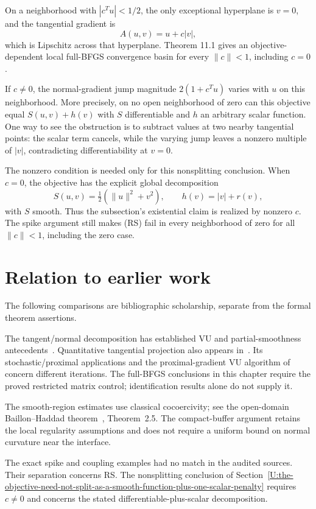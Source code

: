 On a neighborhood with \(|c^Tu|<1/2\), the only exceptional hyperplane
is \(v=0\), and the tangential gradient is \[
 A(u,v)=u+c|v|,
\] which is Lipschitz across that hyperplane. Theorem 11.1 gives an objective-dependent local full-BFGS convergence basin for every $\|c\|<1$, including $c=0$.

If $c\ne0$, the normal-gradient jump magnitude $2(1+c^Tu)$ varies with $u$ on this neighborhood. More precisely, on no open neighborhood of zero can this objective equal $S(u,v)+h(v)$ with $S$ differentiable and $h$ an arbitrary scalar function. One way to see the obstruction is to subtract values at two nearby tangential points: the scalar term cancels, while the varying jump leaves a nonzero multiple of $|v|$, contradicting differentiability at $v=0$.

The nonzero condition is needed only for this nonsplitting conclusion. When $c=0$, the objective has the explicit global decomposition
\[
 S(u,v)=\tfrac12(\|u\|^2+v^2),\qquad h(v)=|v|+r(v),
\]
with $S$ smooth. Thus the subsection's existential claim is realized by nonzero $c$. The spike argument still makes (RS) fail in every neighborhood of zero for all $\|c\|<1$, including the zero case.


\endgroup


\section*{Relation to earlier work}
The following comparisons are bibliographic scholarship, separate from the formal theorem assertions.

The tangent/normal decomposition has established VU and partial-smoothness antecedents~\cite{geom_Lewis2002,LL}. Quantitative tangential projection also appears in~\cite{geom_DDJ2026}. Its stochastic/proximal applications and the proximal-gradient VU algorithm of~\cite{geom_LSS2025} concern different iterations. The full-BFGS conclusions in this chapter require the proved restricted matrix control; identification results alone do not supply it.

The smooth-region estimates use classical cocoercivity; see the open-domain Baillon--Haddad theorem~\cite{WW}, Theorem~2.5. The compact-buffer argument retains the local regularity assumptions and does not require a uniform bound on normal curvature near the interface.

The exact spike and coupling examples had no match in the audited sources. Their separation concerns RS. The nonsplitting conclusion of Section~\ref{U:the-objective-need-not-split-as-a-smooth-function-plus-one-scalar-penalty} requires $c\ne0$ and concerns the stated differentiable-plus-scalar decomposition.
